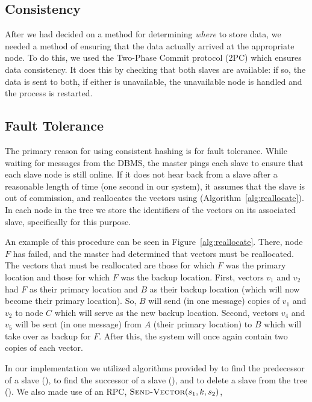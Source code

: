 \subsection{Consistency}
After we had decided on a method for determining \emph{where} to store data,
we needed a method of ensuring that the data actually arrived at the
appropriate node. To do this, we used the Two-Phase Commit protocol (2PC) which
ensures data consistency. It does this by checking that both slaves are
available: if so, the data is sent to both, if either is unavailable, the
unavailable node is handled and the process is restarted. \cite{tanenbaum2017}
%
\subsection{Fault Tolerance}
The primary reason for using consistent hashing is for fault tolerance. While
waiting for messages from the DBMS, the master pings each slave to ensure that
each slave node is still online. If it does not hear back from a slave after a
reasonable length of time (one second in our system), it assumes that the slave
is out of commission, and reallocates the vectors using 
(Algorithm~\ref{alg:reallocate}). In each node in the tree we store the
identifiers of the vectors on its associated slave, specifically for this
purpose.
\par
An example of this procedure can be seen in Figure~\ref{alg:reallocate}. There,
node \(F\) has failed, and the master had determined that vectors must be
reallocated. The vectors that must be reallocated are those for which \(F\) was
the primary location and those for which \(F\) was the backup location. First,
vectors \(v_1\) and \(v_2\) had \(F\) as their primary location and \(B\) as
their backup location (which will now become their primary location). So, \(B\)
will send (in one message) copies of \(v_1\) and \(v_2\) to node \(C\) which
will serve as the new backup location. Second, vectors \(v_4\) and \(v_5\) will
be sent (in one message) from \(A\) (their primary location) to \(B\) which
will take over as backup for \(F\). After this, the system will once again
contain two copies of each vector.
\par
%
In our implementation we utilized algorithms provided by \cite{cormen2009}
to find the predecessor of a slave (), to find the
successor of a slave (), and to delete a slave from the
tree (). We also made use of an RPC,
\(\mathrm{\textsc{Send-Vector}}(s_1, k, s_2)\),
